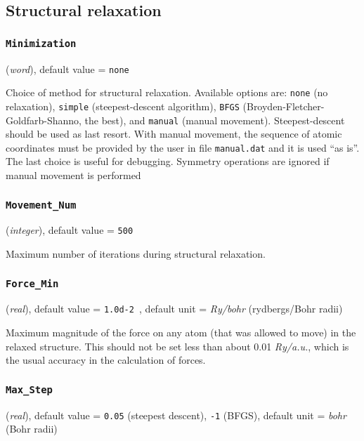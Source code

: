\documentclass{article}
\begin{document}
\subsection{Structural relaxation}

\subsubsection{\tt Minimization 
\label{Minimization}}
({\it word}),
default value = {\tt none }

Choice of method for structural relaxation. Available options are:
{\tt none} (no
relaxation), {\tt simple} (steepest-descent algorithm), {\tt BFGS}
(Broyden-Fletcher-Goldfarb-Shanno, the best), and {\tt manual} (manual movement). Steepest-descent should be
used as last resort. With manual movement, the sequence of atomic coordinates
must be provided by the user in file {\tt manual.dat} and it is used
``as is''. The last choice is useful for debugging. Symmetry operations
are ignored if manual movement is performed

\subsubsection{\tt Movement\_Num 
\label{MovementNum}}
({\it integer}),
default value = {\tt 500 }

Maximum number of iterations during structural relaxation.

\subsubsection{\tt Force\_Min 
\label{ForceMin}}
({\it real}),
default value = {\tt 1.0d-2 },
default unit = {\it Ry/bohr} (rydbergs/Bohr radii)

Maximum magnitude of the force on any atom (that was allowed to move) in the relaxed structure.
This should not be set less than about 0.01 {\it Ry/a.u.}, which is the
usual accuracy in the calculation of forces.

\subsubsection{\tt Max\_Step 
\label{MaxStep}}
({\it real}),
default value = {\tt 0.05} (steepest descent), {\tt -1} (BFGS),
default unit = {\it bohr} (Bohr radii)
\end{document}
